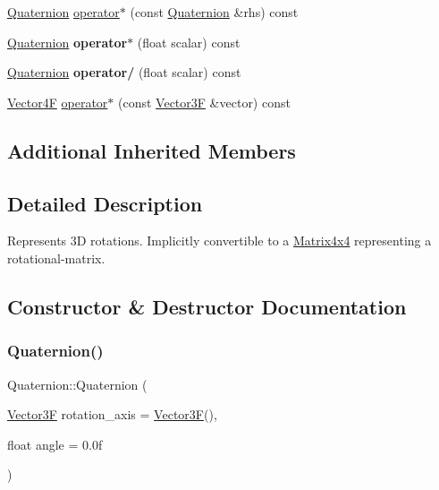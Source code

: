 \begin{DoxyCompactItemize}
\mbox{\hyperlink{class_quaternion}{Quaternion}} \mbox{\hyperlink{class_quaternion_a7cc9bf508bfd8d521a0d246a2cb47194}{operator$\ast$}} (const \mbox{\hyperlink{class_quaternion}{Quaternion}} \&rhs) const
\item 
\mbox{\label{class_quaternion_af19d7a5554539ad967b8c913939dacb6}} 
\mbox{\hyperlink{class_quaternion}{Quaternion}} {\bfseries operator$\ast$} (float scalar) const
\item 
\mbox{\label{class_quaternion_abf1b9fe3ab980e5c97ff0f89c7da9a76}} 
\mbox{\hyperlink{class_quaternion}{Quaternion}} {\bfseries operator/} (float scalar) const
\item 
\mbox{\hyperlink{class_vector4}{Vector4F}} \mbox{\hyperlink{class_quaternion_af0ec7fb0212b1761149d9bd36bf87455}{operator$\ast$}} (const \mbox{\hyperlink{class_vector3}{Vector3F}} \&vector) const
\end{DoxyCompactItemize}
\subsection*{Additional Inherited Members}


\subsection{Detailed Description}
Represents 3D rotations. Implicitly convertible to a \mbox{\hyperlink{class_matrix4x4}{Matrix4x4}} representing a rotational-\/matrix. 

\subsection{Constructor \& Destructor Documentation}
\mbox{\label{class_quaternion_a2f9345c4e4ea54370b26cce4d5b075c2}} 
\subsubsection{\texorpdfstring{Quaternion()}{Quaternion()}\hspace{0.1cm}{\footnotesize\ttfamily [1/3]}}
{\footnotesize\ttfamily Quaternion\+::\+Quaternion (\begin{DoxyParamCaption}\item[{\mbox{\hyperlink{class_vector3}{Vector3F}}}]{rotation\+\_\+axis = {\ttfamily \mbox{\hyperlink{class_vector3}{Vector3F}}()},  }\item[{float}]{angle = {\ttfamily 0.0f} }\end{DoxyParamCaption})}

